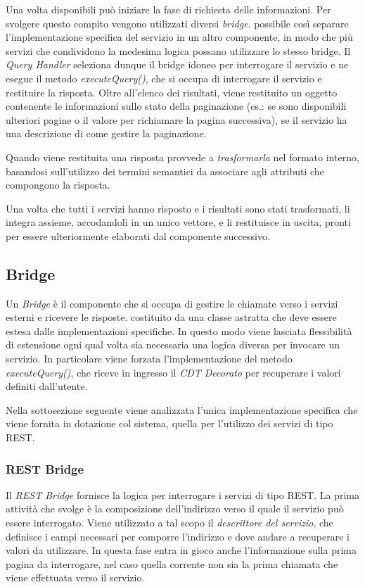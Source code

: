 Una volta disponibili può iniziare la fase di richiesta delle informazioni. Per svolgere questo compito vengono utilizzati diversi \emph{bridge}. \upe possibile così separare l'implementazione specifica del servizio in un altro componente, in modo che più servizi che condividono la medesima logica possano utilizzare lo stesso bridge. Il \emph{Query Handler} seleziona dunque il bridge idoneo per interrogare il servizio e ne esegue il metodo \emph{executeQuery()}, che si occupa di interrogare il servizio e restituire la risposta. Oltre all'elenco dei risultati, viene restituito un oggetto contenente le informazioni sullo stato della paginazione (es.: se sono disponibili ulteriori pagine o il valore per richiamare la pagina successiva), se il servizio ha una descrizione di come gestire la paginazione.

Quando viene restituita una risposta provvede a \emph{trasformarla} nel formato interno, basandosi sull'utilizzo dei termini semantici da associare agli attributi che compongono la risposta.

Una volta che tutti i servizi hanno risposto e i risultati sono stati trasformati, li integra assieme, accodandoli in un unico vettore, e li restituisce in uscita, pronti per essere ulteriormente elaborati dal componente successivo.

\subsection{Bridge\label{sec:bridge}}

Un \emph{Bridge} è il componente che si occupa di gestire le chiamate verso i servizi esterni e ricevere le risposte. \upe costituito da una classe astratta che deve essere estesa dalle implementazioni specifiche. In questo modo viene lasciata flessibilità di estensione ogni qual volta sia necessaria una logica diversa per invocare un servizio. In particolare viene forzata l'implementazione del metodo \emph{executeQuery()}, che riceve in ingresso il \emph{CDT Decorato} per recuperare i valori definiti dall'utente.

Nella sottosezione seguente viene analizzata l'unica implementazione specifica che viene fornita in dotazione col sistema, quella per l'utilizzo dei servizi di tipo REST.

\subsubsection*{REST Bridge}

Il \emph{REST Bridge} fornisce la logica per interrogare i servizi di tipo REST. La prima attività che svolge è la composizione dell'indirizzo verso il quale il servizio può essere interrogato. Viene utilizzato a tal scopo il \emph{descrittore del servizio}, che definisce i campi necessari per comporre l'indirizzo e dove andare a recuperare i valori da utilizzare. In questa fase entra in gioco anche l'informazione sulla prima pagina da interrogare, nel caso quella corrente non sia la prima chiamata che viene effettuata verso il servizio.

